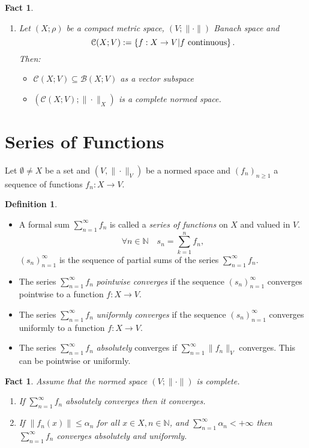 \documentclass[12pt]{amsbook}
\newtheorem{fact}[theorem]{Fact}
\theoremstyle{definition}
\newtheorem{definition}[theorem]{Definition}
\newcommand{\NN}{{\mathbb N}}
\newcommand{\cB}{{\mathcal B}}
\newcommand{\cC}{{\mathcal C}}
\newcommand{\ra}{\rightarrow} %
\begin{document}
\begin{fact}
\begin{enumerate}
\begin{proof}
hence $f_n \xrightarrow[n]{\|\cdot\|_X} f$.
\end{proof}

\item Let $(X; \rho)$ be a compact metric space, $(V; \|\cdot\|)$ Banach space and
\begin{equation*} \cC(X; V) := \left\{f: X \ra V | f \textup{ continuous} \right\}. \end{equation*}
Then:
\begin{itemize}
\item[$\bullet$] $\cC(X; V) \subseteq \cB(X; V)$ as a vector subspace
\item[$\bullet$] $(\cC(X; V); \|\cdot\|_X)$ is a complete normed space.
\end{itemize}
\end{enumerate}
\end{fact}

\section{Series of Functions}

Let $\emptyset \neq X$ be a set and $(V, \|\cdot\|_V)$ be a normed space and $(f_n)_{n \geq 1}$ a sequence of functions $f_n : X \ra V$.

\begin{definition}
\begin{itemize}
\item[$\bullet$] A formal sum $\sum_{n=1}^\infty f_n$ is called a \emph{series of functions} on $X$ and valued in $V$.
\begin{equation*} \forall n \in \NN \quad s_n = \sum_{k=1}^n f_n, \end{equation*}
$(s_n)_{n=1}^\infty$ is the sequence of partial sums of the series $\sum_{n=1}^\infty f_n$.
\item[$\bullet$] The series $\sum_{n=1}^\infty f_n$ \emph{pointwise converges} if the sequence $(s_n)_{n=1}^\infty$ converges pointwise to a function $f: X \ra V$.
\item[$\bullet$] The series $\sum_{n=1}^\infty f_n$ \emph{uniformly converges} if the sequence $(s_n)_{n=1}^\infty$ converges uniformly to a function $f: X \ra V$.
\item[$\bullet$] The series $\sum_{n=1}^\infty f_n$ \emph{absolutely} converges if $\sum_{n=1}^\infty \|f_n\|_V$ converges. This can be pointwise or uniformly.
\end{itemize}
\end{definition}

\begin{fact} 
Assume that the normed space $(V; \|\cdot\|)$ is complete.
\begin{enumerate}
\item If $\sum_{n=1}^\infty f_n$ absolutely converges then it converges.
\item If $\|f_n(x)\| \leq \alpha_n$ for all $x \in X, n \in \NN$, and $\sum_{n=1}^\infty \alpha_n < +\infty$ then $\sum_{n=1}^\infty f_n$ converges absolutely and uniformly.
\end{enumerate}
\end{fact}
\end{document}
